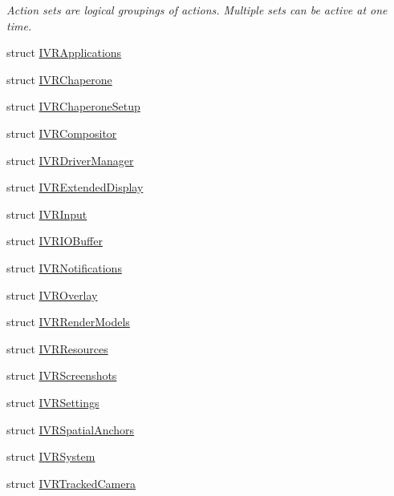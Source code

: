 \begin{DoxyCompactItemize}
\begin{DoxyCompactList}\small\item\em Action sets are logical groupings of actions. Multiple sets can be active at one time. \end{DoxyCompactList}\item 
struct \mbox{\hyperlink{struct_valve_1_1_v_r_1_1_i_v_r_applications}{I\+V\+R\+Applications}}
\item 
struct \mbox{\hyperlink{struct_valve_1_1_v_r_1_1_i_v_r_chaperone}{I\+V\+R\+Chaperone}}
\item 
struct \mbox{\hyperlink{struct_valve_1_1_v_r_1_1_i_v_r_chaperone_setup}{I\+V\+R\+Chaperone\+Setup}}
\item 
struct \mbox{\hyperlink{struct_valve_1_1_v_r_1_1_i_v_r_compositor}{I\+V\+R\+Compositor}}
\item 
struct \mbox{\hyperlink{struct_valve_1_1_v_r_1_1_i_v_r_driver_manager}{I\+V\+R\+Driver\+Manager}}
\item 
struct \mbox{\hyperlink{struct_valve_1_1_v_r_1_1_i_v_r_extended_display}{I\+V\+R\+Extended\+Display}}
\item 
struct \mbox{\hyperlink{struct_valve_1_1_v_r_1_1_i_v_r_input}{I\+V\+R\+Input}}
\item 
struct \mbox{\hyperlink{struct_valve_1_1_v_r_1_1_i_v_r_i_o_buffer}{I\+V\+R\+I\+O\+Buffer}}
\item 
struct \mbox{\hyperlink{struct_valve_1_1_v_r_1_1_i_v_r_notifications}{I\+V\+R\+Notifications}}
\item 
struct \mbox{\hyperlink{struct_valve_1_1_v_r_1_1_i_v_r_overlay}{I\+V\+R\+Overlay}}
\item 
struct \mbox{\hyperlink{struct_valve_1_1_v_r_1_1_i_v_r_render_models}{I\+V\+R\+Render\+Models}}
\item 
struct \mbox{\hyperlink{struct_valve_1_1_v_r_1_1_i_v_r_resources}{I\+V\+R\+Resources}}
\item 
struct \mbox{\hyperlink{struct_valve_1_1_v_r_1_1_i_v_r_screenshots}{I\+V\+R\+Screenshots}}
\item 
struct \mbox{\hyperlink{struct_valve_1_1_v_r_1_1_i_v_r_settings}{I\+V\+R\+Settings}}
\item 
struct \mbox{\hyperlink{struct_valve_1_1_v_r_1_1_i_v_r_spatial_anchors}{I\+V\+R\+Spatial\+Anchors}}
\item 
struct \mbox{\hyperlink{struct_valve_1_1_v_r_1_1_i_v_r_system}{I\+V\+R\+System}}
\item 
struct \mbox{\hyperlink{struct_valve_1_1_v_r_1_1_i_v_r_tracked_camera}{I\+V\+R\+Tracked\+Camera}}

\end{DoxyCompactItemize}
